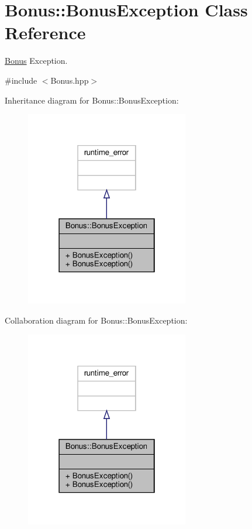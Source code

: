 \hypertarget{class_bonus_1_1_bonus_exception}{}\section{Bonus\+:\+:Bonus\+Exception Class Reference}
\label{class_bonus_1_1_bonus_exception}


\hyperlink{class_bonus}{Bonus} Exception.  




{\ttfamily \#include $<$Bonus.\+hpp$>$}



Inheritance diagram for Bonus\+:\+:Bonus\+Exception\+:
\nopagebreak
\begin{figure}[H]
\begin{center}
\leavevmode
\includegraphics[width=202pt]{class_bonus_1_1_bonus_exception__inherit__graph}
\end{center}
\end{figure}


Collaboration diagram for Bonus\+:\+:Bonus\+Exception\+:
\nopagebreak
\begin{figure}[H]
\begin{center}
\leavevmode
\includegraphics[width=202pt]{class_bonus_1_1_bonus_exception__coll__graph}
\end{center}
\end{figure}
